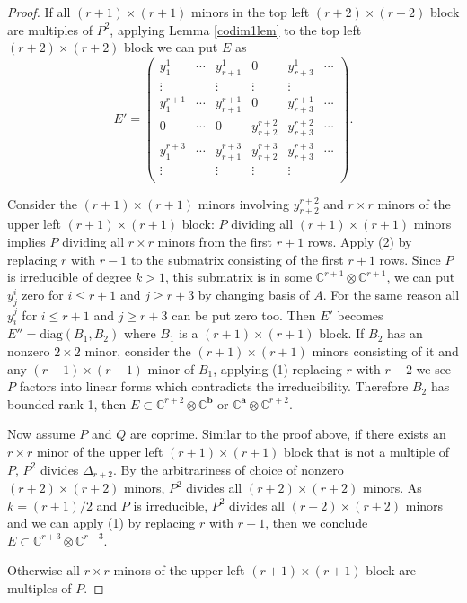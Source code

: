\documentclass[10pt]{article} %
\newcommand{\aaa}{\mathbf{a}}
\newcommand{\bbb}{\mathbf{b}}
\theoremstyle{definition}
\begin{document}
\begin{proof}
If all $(r+1)\times (r+1)$ minors in the top left $(r+2)\times(r+2)$ block are multiples of $P^2$, applying Lemma \ref{codim1lem} to the top left $(r+2)\times(r+2)$ block we can put $E$ as
$$E'=\begin{pmatrix}
y^1_1 &\cdots&y^1_{r+1} & 0 & y^1_{r+3}& \cdots\\
\vdots &     &\vdots & \vdots & \vdots &  \\
y^{r+1}_1 &\cdots&y^{r+1}_{r+1} & 0 & y^{r+1}_{r+3}& \cdots\\
0 &\cdots&0 & y^{r+2}_{r+2} & y^{r+2}_{r+3}& \cdots\\
y^{r+3}_1&\cdots&y^{r+3}_{r+1} & y^{r+3}_{r+2} & y^{r+3}_{r+3}& \cdots\\
\vdots &     &\vdots & \vdots & \vdots &  \\
\end{pmatrix}.$$

Consider the $(r+1)\times (r+1)$ minors involving $y^{r+2}_{r+2}$ and $r\times r$ minors of the upper left $(r+1)\times (r+1)$ block: $P$ dividing all $(r+1)\times (r+1)$ minors implies $P$ dividing all $r\times r$ minors from the first $r+1$ rows. Apply (2) by replacing $r$ with $r-1$ to the submatrix consisting of the first $r+1$ rows. Since $P$ is irreducible of degree $k>1$, this submatrix is in some $\mathbb{C}^{r+1}\otimes \mathbb{C}^{r+1}$, we can put $y^i_j$ zero for $i\leq r+1$ and $j\geq r+3$ by changing basis of $A$. For the same reason all $y^j_i$ for $i\leq r+1$ and $j\geq r+3$ can be put zero too. Then $E'$ becomes $E''=\mathrm{diag}(B_1,B_2)$ where $B_1$ is a $(r+1)\times (r+1)$ block. If $B_2$ has an nonzero $2\times 2$ minor, consider the $(r+1)\times (r+1)$ minors consisting of it and any $(r-1)\times(r-1)$ minor of $B_1$, applying (1) replacing $r$ with $r-2$ we see $P$ factors into linear forms which contradicts the irreducibility. Therefore $B_2$ has bounded rank 1, then $E\subset \mathbb{C}^{r+2}\otimes \mathbb{C}^{\bbb}$ or $\mathbb{C}^{\aaa}\otimes \mathbb{C}^{r+2}$.

Now assume $P$ and $Q$ are coprime. Similar to the proof above, if there exists an $r\times r$ minor of the upper left $(r+1)\times(r+1)$ block that is not a multiple of $P$, $P^2$ divides $\Delta_{r+2}$. By the arbitrariness of choice of nonzero $(r+2)\times(r+2)$ minors, $P^2$ divides all $(r+2)\times(r+2)$ minors. As $k=(r+1)/2$ and $P$ is irreducible, $P^2$ divides all $(r+2)\times(r+2)$ minors and we can apply (1) by replacing $r$ with $r+1$, then we conclude $E\subset\mathbb{C}^{r+3}\otimes\mathbb{C}^{r+3}$.

Otherwise all $r\times r$ minors of the upper left $(r+1)\times(r+1)$ block are multiples of $P$.
\end{proof}
\end{document}
